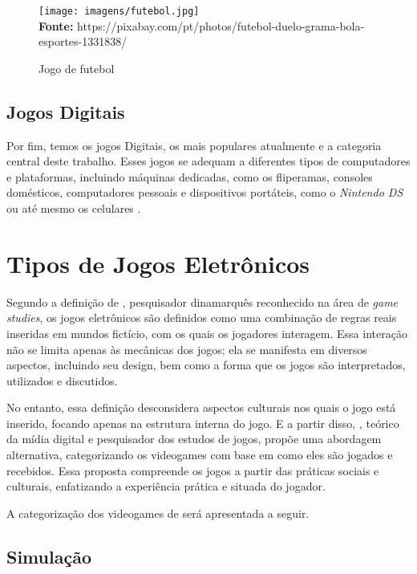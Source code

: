 \FloatBarrier 
\begin{figure}[!htbp]
	\centering
	\caption{Jogo de futebol}
	\texttt{[image: imagens/futebol.jpg]}
	\\\textbf{Fonte:} https://pixabay.com/pt/photos/futebol-duelo-grama-bola-esportes-1331838/
	\label{fig:futebol}
\end{figure}
\FloatBarrier



\subsection{Jogos Digitais}


Por fim, temos os jogos Digitais, os mais populares atualmente e a categoria central deste trabalho. Esses jogos se adequam a diferentes tipos de computadores e plataformas, incluindo máquinas dedicadas, como os fliperamas, consoles domésticos, computadores pessoais e dispositivos portáteis, como o \textit{Nintendo DS} ou até mesmo os celulares \cite{Crawford1997}.


\section{Tipos de Jogos Eletrônicos}

Segundo a definição de , pesquisador dinamarquês reconhecido na área de \textit{game studies}, os jogos eletrônicos são definidos como uma combinação de regras reais inseridas em mundos fictício, com os quais os jogadores interagem. Essa interação não se limita apenas às mecânicas dos jogos; ela se manifesta em diversos aspectos, incluindo seu design, bem como a forma que os jogos são interpretados, utilizados e discutidos.

No entanto, essa definição desconsidera aspectos culturais nos quais o jogo está inserido, focando apenas na estrutura interna do jogo. E a partir disso, , teórico da mídia digital e pesquisador dos estudos de jogos, propõe uma abordagem alternativa, categorizando os videogames com base em como eles são jogados e recebidos. Essa proposta compreende os jogos a partir das práticas sociais e culturais, enfatizando a experiência prática e situada do jogador.

A categorização dos videogames de  será apresentada a seguir.


\subsection{Simulação}


